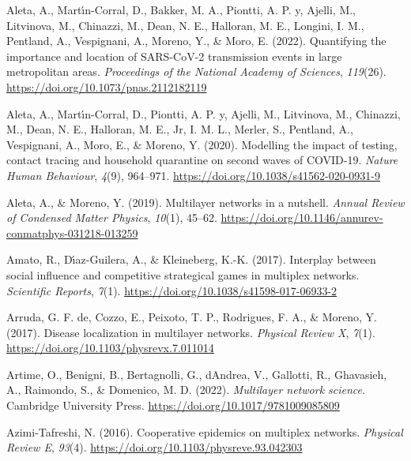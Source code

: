 \documentclass[
]{article}
\newlength{\cslhangindent}
\newlength{\cslentryspacingunit} %
\newenvironment{CSLReferences}[2] %
 {%
  \setlength{\parindent}{0pt}
  \ifodd #1
  \let\oldpar\par
  \def\par{\hangindent=\cslhangindent\oldpar}
  \fi
  \setlength{\parskip}{#2\cslentryspacingunit}
 }%
 {}
\begin{document}
\hypertarget{refs}{}
\begin{CSLReferences}{1}{0}
\leavevmode{}%
Aleta, A., Martı́n-Corral, D., Bakker, M. A., Piontti, A. P. y, Ajelli,
M., Litvinova, M., Chinazzi, M., Dean, N. E., Halloran, M. E., Longini,
I. M., Pentland, A., Vespignani, A., Moreno, Y., \& Moro, E. (2022).
Quantifying the importance and location of {SARS}-{CoV}-2 transmission
events in large metropolitan areas. \emph{Proceedings of the National
Academy of Sciences}, \emph{119}(26).
\url{https://doi.org/10.1073/pnas.2112182119}

\leavevmode{}%
Aleta, A., Martı́n-Corral, D., Piontti, A. P. y, Ajelli, M., Litvinova,
M., Chinazzi, M., Dean, N. E., Halloran, M. E., Jr, I. M. L., Merler,
S., Pentland, A., Vespignani, A., Moro, E., \& Moreno, Y. (2020).
Modelling the impact of testing, contact tracing and household
quarantine on second waves of {COVID}-19. \emph{Nature Human Behaviour},
\emph{4}(9), 964--971. \url{https://doi.org/10.1038/s41562-020-0931-9}

\leavevmode{}%
Aleta, A., \& Moreno, Y. (2019). Multilayer networks in a nutshell.
\emph{Annual Review of Condensed Matter Physics}, \emph{10}(1), 45--62.
\url{https://doi.org/10.1146/annurev-conmatphys-031218-013259}

\leavevmode{}%
Amato, R., Dı́az-Guilera, A., \& Kleineberg, K.-K. (2017). Interplay
between social influence and competitive strategical games in multiplex
networks. \emph{Scientific Reports}, \emph{7}(1).
\url{https://doi.org/10.1038/s41598-017-06933-2}

\leavevmode{}%
Arruda, G. F. de, Cozzo, E., Peixoto, T. P., Rodrigues, F. A., \&
Moreno, Y. (2017). Disease localization in multilayer networks.
\emph{Physical Review X}, \emph{7}(1).
\url{https://doi.org/10.1103/physrevx.7.011014}

\leavevmode{}%
Artime, O., Benigni, B., Bertagnolli, G., dAndrea, V., Gallotti, R.,
Ghavasieh, A., Raimondo, S., \& Domenico, M. D. (2022). \emph{Multilayer
network science}. Cambridge University Press.
\url{https://doi.org/10.1017/9781009085809}

\leavevmode{}%
Azimi-Tafreshi, N. (2016). Cooperative epidemics on multiplex networks.
\emph{Physical Review E}, \emph{93}(4).
\url{https://doi.org/10.1103/physreve.93.042303}


\end{CSLReferences}
\end{document}
